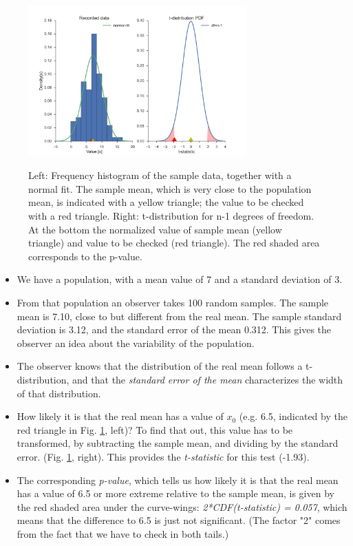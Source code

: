 \begin{figure}[h]
  \centering
  \includegraphics[width=0.75\textwidth]{../Images/ttestExplained.png}\\
  \caption{Left: Frequency histogram of the sample data, together with a normal fit. The sample mean, which is very close to the population mean, is indicated with a yellow triangle; the value to be checked with a red triangle. Right: t-distribution for n-1 degrees of freedom. At the bottom the normalized value of sample mean (yellow triangle) and value to be checked (red triangle). The red shaded area corresponds to the p-value.}\label{fig:ttestExplained}
\end{figure}

\begin{itemize}
  \item We have a population, with a mean value of 7 and a standard deviation of 3.
  \item From that population an observer takes 100 random samples. The sample mean is 7.10, close to but different from the real mean. The sample standard deviation is 3.12, and the standard error of the mean 0.312. This gives the observer an idea about the variability of the population.
  \item The observer knows that the distribution of the real mean follows a t-distribution, and that the \emph{standard error of the mean} characterizes the width of that distribution.
  \item How likely it is that the real mean has a value of $x_0$ (e.g. 6.5, indicated by the red triangle in Fig. \ref{fig:ttestExplained}, left)? To find that out, this value has to be transformed, by subtracting the sample mean, and dividing by the standard error. (Fig. \ref{fig:ttestExplained}, right). This provides the \emph{t-statistic} for this test (-1.93).
  \item The corresponding \emph{p-value}, which tells us how likely it is that the real mean has a value of 6.5 or more extreme relative to the sample mean, is given by the red shaded area under the curve-wings: \emph{2*CDF(t-statistic) = 0.057}, which means that the difference to 6.5 is just not significant. (The factor "2" comes from the fact that we have to check in both tails.)
\end{itemize}

